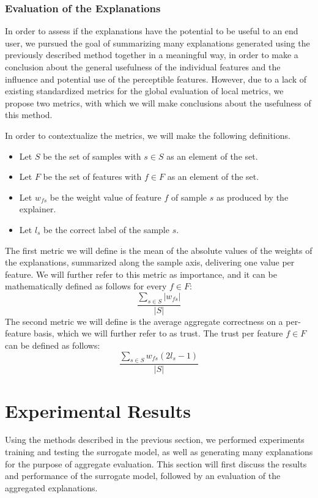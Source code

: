 \documentclass{article}
\begin{document}
			\subsubsection{Evaluation of the Explanations}
			In order to assess if the explanations have the potential to be useful to an end
			user, we pursued the goal of summarizing many explanations generated using the
			previously described method together in a meaningful way, in order to make a
			conclusion about the general usefulness of the individual features and the influence
			and potential use of the perceptible features. However, due to a lack of existing
			standardized metrics for the global evaluation of local metrics, we propose two
			metrics, with which we will make conclusions about the usefulness of this method.
			\par
			In order to contextualize the metrics, we will make the following definitions.
			\begin{itemize}
				\item Let \(S\) be the set of samples with \(s \in S\) as an element of the set.
				\item Let \(F\) be the set of features with \(f \in F\) as an element of the set.
				\item Let \(w_{fs}\) be the weight value of feature \(f\) of sample \(s\) as
					produced by the explainer.
				\item Let \(l_{s}\) be the correct label of the sample \(s\).
			\end{itemize}
			The first metric we will define is the mean of the absolute values of the weights of
			the explanations, summarized along the sample axis, delivering one value per feature.
			We will further refer to this metric as importance, and it can be mathematically
			defined as follows for every \(f \in F\):
			\[\frac{\sum_{s \in S} |w_{fs}|}{|S|}\]
			The second metric we will define is the average aggregate correctness on a per-feature
			basis, which we will further refer to as trust. The trust per feature \(f \in F\) can
			be defined as follows:
			\[\frac{\sum_{s \in S} w_{fs}(2l_{s}-1)}{|S|}\]
	\section{Experimental Results}
	Using the methods described in the previous section, we performed experiments training and
	testing the surrogate model, as well as generating many explanations for the purpose of
	aggregate evaluation. This section will first discuss the results and performance of the
	surrogate model, followed by an evaluation of the aggregated explanations.
\end{document}
